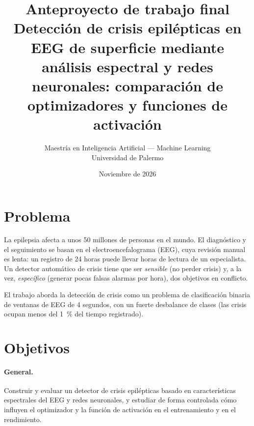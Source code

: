 \documentclass[11pt]{article}
\title{Anteproyecto de trabajo final\\[0.3em]
\large Detección de crisis epilépticas en EEG de superficie mediante análisis espectral y redes neuronales: comparación de optimizadores y funciones de activación}
\author{Maestría en Inteligencia Artificial --- Machine Learning\\Universidad de Palermo}
\date{Noviembre de 2026}
\begin{document}
\maketitle

\section{Problema}

La epilepsia afecta a unos 50 millones de personas en el mundo. El diagnóstico y el seguimiento se basan en el electroencefalograma (EEG), cuya revisión manual es lenta: un registro de 24 horas puede llevar horas de lectura de un especialista. Un detector automático de crisis tiene que ser \emph{sensible} (no perder crisis) y, a la vez, \emph{específico} (generar pocas falsas alarmas por hora), dos objetivos en conflicto.

El trabajo aborda la detección de crisis como un problema de clasificación binaria de ventanas de EEG de 4 segundos, con un fuerte desbalance de clases (las crisis ocupan menos del 1~\% del tiempo registrado).

\section{Objetivos}

\paragraph{General.} Construir y evaluar un detector de crisis epilépticas basado en características espectrales del EEG y redes neuronales, y estudiar de forma controlada cómo influyen el optimizador y la función de activación en el entrenamiento y en el rendimiento.
\end{document}
